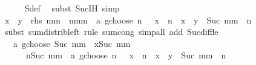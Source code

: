 \begin{isabellebody}
\ \ \ \ \isamarkupfalse%
\ S{\isacharunderscore}{\kern0pt}def\ \isamarkupfalse%
\ {\isacharparenleft}{\kern0pt}subst\ Suc{\isachardot}{\kern0pt}IH{\isacharparenright}{\kern0pt}\ simp\isanewline
\ \ \isamarkupfalse%
\ \isamarkupfalse%
\ {\isachardoublequoteopen}{\isacharparenleft}{\kern0pt}x\ {\isacharplus}{\kern0pt}\ y{\isacharparenright}{\kern0pt}\ {\isacharasterisk}{\kern0pt}\ {\isacharquery}{\kern0pt}rhs\ mm\ {\isacharequal}{\kern0pt}\ {\isacharparenleft}{\kern0pt}{\isasymSum}n{\isasymle}mm{\isachardot}{\kern0pt}\ {\isacharparenleft}{\kern0pt}{\isacharparenleft}{\kern0pt}{\isacharminus}{\kern0pt}\ a\ gchoose\ n{\isacharparenright}{\kern0pt}\ {\isacharasterisk}{\kern0pt}\ {\isacharparenleft}{\kern0pt}{\isacharminus}{\kern0pt}\ x{\isacharparenright}{\kern0pt}\ {\isacharcircum}{\kern0pt}\ n\ {\isacharasterisk}{\kern0pt}\ {\isacharparenleft}{\kern0pt}x\ {\isacharplus}{\kern0pt}\ y{\isacharparenright}{\kern0pt}\ {\isacharcircum}{\kern0pt}\ {\isacharparenleft}{\kern0pt}Suc\ mm\ {\isacharminus}{\kern0pt}\ n{\isacharparenright}{\kern0pt}{\isacharparenright}{\kern0pt}{\isacharparenright}{\kern0pt}{\isachardoublequoteclose}\isanewline
\ \ \ \ \isamarkupfalse%
\ {\isacharparenleft}{\kern0pt}subst\ sum{\isacharunderscore}{\kern0pt}distrib{\isacharunderscore}{\kern0pt}left{\isacharcomma}{\kern0pt}\ rule\ sum{\isachardot}{\kern0pt}cong{\isacharparenright}{\kern0pt}\ {\isacharparenleft}{\kern0pt}simp{\isacharunderscore}{\kern0pt}all\ add{\isacharcolon}{\kern0pt}\ Suc{\isacharunderscore}{\kern0pt}diff{\isacharunderscore}{\kern0pt}le{\isacharparenright}{\kern0pt}\isanewline
\ \ \isamarkupfalse%
\ \isamarkupfalse%
\ {\isachardoublequoteopen}{\isasymdots}\ {\isacharplus}{\kern0pt}\ {\isacharparenleft}{\kern0pt}{\isacharminus}{\kern0pt}a\ gchoose\ {\isacharparenleft}{\kern0pt}Suc\ mm{\isacharparenright}{\kern0pt}{\isacharparenright}{\kern0pt}\ {\isacharasterisk}{\kern0pt}\ {\isacharparenleft}{\kern0pt}{\isacharminus}{\kern0pt}x{\isacharparenright}{\kern0pt}{\isacharcircum}{\kern0pt}Suc\ mm\ {\isacharequal}{\kern0pt}\isanewline
\ \ \ \ \ \ {\isacharparenleft}{\kern0pt}{\isasymSum}n{\isasymle}Suc\ mm{\isachardot}{\kern0pt}\ {\isacharparenleft}{\kern0pt}{\isacharminus}{\kern0pt}\ a\ gchoose\ n{\isacharparenright}{\kern0pt}\ {\isacharasterisk}{\kern0pt}\ {\isacharparenleft}{\kern0pt}{\isacharminus}{\kern0pt}\ x{\isacharparenright}{\kern0pt}\ {\isacharcircum}{\kern0pt}\ n\ {\isacharasterisk}{\kern0pt}\ {\isacharparenleft}{\kern0pt}x\ {\isacharplus}{\kern0pt}\ y{\isacharparenright}{\kern0pt}\ {\isacharcircum}{\kern0pt}\ {\isacharparenleft}{\kern0pt}Suc\ mm\ {\isacharminus}{\kern0pt}\ n{\isacharparenright}{\kern0pt}{\isacharparenright}{\kern0pt}{\isachardoublequoteclose}\isanewline

\end{isabellebody}
